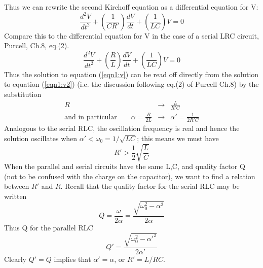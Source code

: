 \documentclass[makesolutionspdf]{esg8022pset}
\begin{document}
\begin{solution}
  Thus we can rewrite the second Kirchoff equation as a differential
  equation for V:
  \begin{equation}\label{eqn1:v}
  \frac{d^2V}{dt^2}+\left(\frac{1}{CR'}\right)\frac{dV}{dt}+\left(\frac{1}{LC}\right)V=0
  \end{equation}
  Compare this to the differential equation for V in the case of a
  serial LRC circuit, Purcell, Ch.8, eq.(2).
  \begin{equation}\label{eqn1:v2}
  \frac{d^2V}{dt^2}+\left(\frac{R}{L}\right)\frac{dV}{dt}+\left(\frac{1}{LC}\right)V=0
  \end{equation}
  Thus the solution to equation (\ref{eqn1:v}) can be read off directly
  from the solution to equation (\ref{eqn1:v2}) (i.e. the discussion
  following eq.(2) of Purcell Ch.8) by the substitution
  \begin{eqnarray}
  R &\rightarrow & \frac{L}{R'C}\\ \textrm{and in particular}\qquad
  \alpha=\frac{R}{2L} &\rightarrow & \alpha'=\frac{1}{2R'C}
  \end{eqnarray}
  Analogous to the serial RLC, the oscillation frequency is real and hence
  the solution oscillates when $\alpha'<\omega_0=1/\sqrt{LC}$; this
  means we must have
  \begin{equation}
  R'>\frac{1}{2}\sqrt{\frac{L}{C}}
  \end{equation}
  When the parallel and serial circuits have the same L,C, and quality
  factor Q (not to be confused with the charge on the capacitor), we
  want to find a relation between $R'$ and $R$.  Recall that the quality
  factor for the serial RLC may be written
  \begin{equation}
  Q=\frac{\omega}{2\alpha}=\frac{\sqrt{\omega_0^2-\alpha^2}}{2\alpha}
  \end{equation}
  Thus Q for the parallel RLC
  \begin{equation}
  Q'=\frac{\sqrt{\omega_0^2-\alpha'^2}}{2\alpha'}
  \end{equation}
  Clearly $Q'=Q$ implies that $\alpha'=\alpha$, or $R'=L/RC$.
\end{solution}
\end{document}
